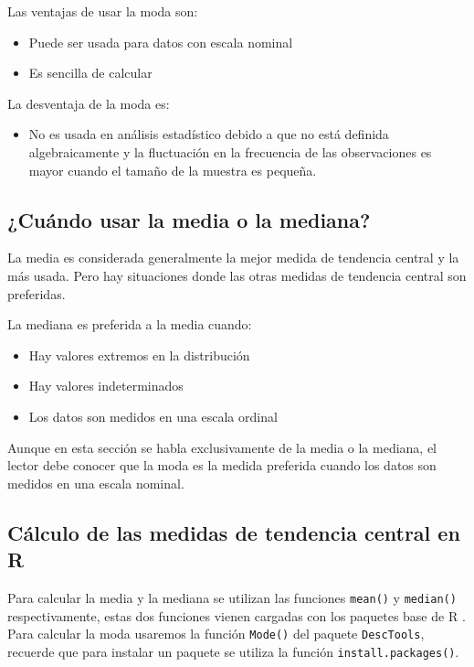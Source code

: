\documentclass[letterpaper,]{book}
\providecommand{\tightlist}{%
  \setlength{\itemsep}{0pt}\setlength{\parskip}{0pt}}
\begin{document}
Las ventajas de usar la moda son:

\begin{itemize}
\tightlist
\item
  Puede ser usada para datos con escala nominal
\item
  Es sencilla de calcular
\end{itemize}

La desventaja de la moda es:

\begin{itemize}
\tightlist
\item
  No es usada en análisis estadístico debido a que no está definida algebraicamente y la fluctuación en la frecuencia de las observaciones es mayor cuando el tamaño de la muestra es pequeña.
\end{itemize}

\hypertarget{cuando-usar-la-media-o-la-mediana}{%
\subsection{¿Cuándo usar la media o la mediana?}\label{cuando-usar-la-media-o-la-mediana}}

La media es considerada generalmente la mejor medida de tendencia central y la más usada. Pero hay situaciones donde las otras medidas de tendencia central son preferidas.

La mediana es preferida a la media cuando:

\begin{itemize}
\tightlist
\item
  Hay valores extremos en la distribución
\item
  Hay valores indeterminados
\item
  Los datos son medidos en una escala ordinal
\end{itemize}

Aunque en esta sección se habla exclusivamente de la media o la mediana, el lector debe conocer que la moda es la medida preferida cuando los datos son medidos en una escala nominal.

\hypertarget{calculo-de-las-medidas-de-tendencia-central-en-r}{%
\subsection{Cálculo de las medidas de tendencia central en R}\label{calculo-de-las-medidas-de-tendencia-central-en-r}}

Para calcular la media y la mediana se utilizan las funciones \texttt{mean()} y \texttt{median()} respectivamente, estas dos funciones vienen cargadas con los paquetes base de R \citep{verzani2014}. Para calcular la moda usaremos la función \texttt{Mode()} del paquete \texttt{DescTools}, recuerde que para instalar un paquete se utiliza la función \texttt{install.packages()}.
\end{document}
